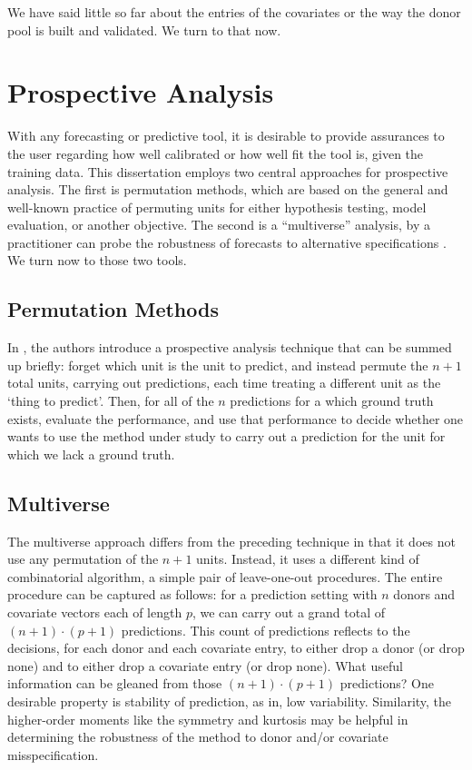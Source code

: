 \documentclass{uiucthesis2021}
\theoremstyle{definition}
\begin{document}
We have said little so far about the entries of the covariates or the way the donor pool is built and validated.  We turn to that now.

\section{Prospective Analysis}
With any forecasting or predictive tool, it is desirable to provide assurances to the user regarding how well calibrated or how well fit the tool is, given the training data.  This dissertation employs two central approaches for prospective analysis.  The first is permutation methods, which are based on the general and well-known practice of permuting units for either hypothesis testing, model evaluation, or another objective.  The second is a ``multiverse'' analysis, by a practitioner can probe the robustness of forecasts to alternative specifications \cite[][]{steegen2016increasing}.  We turn now to those two tools.
\subsection{Permutation Methods}

In \cite[][]{lin2021minimizing}, the authors introduce a prospective analysis technique that can be summed up briefly: forget which unit is the unit to predict, and instead permute the $n+1$ total units, carrying out predictions, each time treating a different unit as the `thing to predict'.  Then, for all of the $n$ predictions for a which ground truth exists, evaluate the performance, and use that performance to decide whether one wants to use the method under study to carry out a prediction for the unit for which we lack a ground truth.

\subsection{Multiverse}
The multiverse approach differs from the preceding technique in that it does not use any permutation of the $n+1$ units.  Instead, it uses a different kind of combinatorial algorithm, a simple pair of leave-one-out procedures.  The entire procedure can be captured as follows: for a prediction setting with $n$ donors and covariate vectors each of length $p$, we can carry out a grand total of $(n+1)\cdot(p+1)$ predictions.  This count of predictions reflects to the decisions, for each donor and each covariate entry, to either drop a donor (or drop none) and to either drop a covariate entry (or drop none).  What useful information can be gleaned from those $(n+1)\cdot(p+1)$ predictions?  One desirable property is stability of prediction, as in, low variability.  Similarity, the higher-order moments like the symmetry and kurtosis may be helpful in determining the robustness of the method to donor and/or covariate misspecification.
\end{document}

